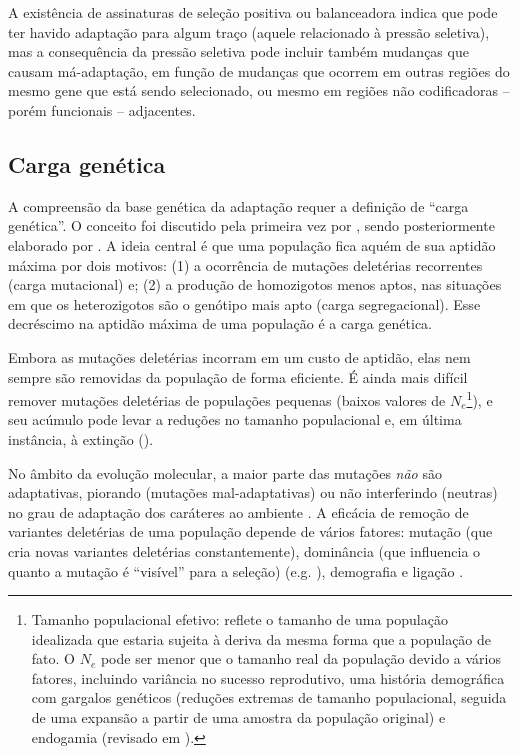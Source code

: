 \begin{refsection}
A existência de assinaturas de seleção positiva ou balanceadora indica que pode ter havido adaptação para algum traço (aquele relacionado à pressão seletiva), mas a consequência da pressão seletiva pode incluir também mudanças que causam má-adaptação, em função de mudanças que ocorrem em outras regiões do mesmo gene que está sendo selecionado, ou mesmo em regiões não codificadoras  -- porém funcionais -- adjacentes.

\subsection{Carga genética}%
%

	A compreensão da base genética da adaptação requer a definição de “carga genética”. O conceito foi discutido pela primeira vez por \textcite{Haldane1937}, sendo posteriormente elaborado por \textcite{Muller1950}. A ideia central é que uma população fica aquém de sua aptidão máxima por dois motivos: (1) a ocorrência de mutações deletérias recorrentes (carga mutacional) e; (2) a produção de homozigotos menos aptos, nas situações em que os heterozigotos são o genótipo mais apto (carga segregacional). Esse decréscimo na aptidão máxima de uma população é a carga genética.
%

Embora as mutações deletérias incorram em um custo de aptidão, elas nem sempre são removidas da população de forma eficiente. É ainda mais difícil remover mutações deletérias de populações pequenas (baixos valores de $N_{e}$\footnote{Tamanho populacional efetivo: reflete o tamanho de uma população idealizada que estaria sujeita à deriva da mesma forma que a população de fato. O $N_{e}$ pode ser menor que o tamanho real da população devido a vários fatores, incluindo variância no sucesso reprodutivo, uma história demográfica com gargalos genéticos (reduções extremas de tamanho populacional, seguida de uma expansão a partir de uma amostra da população original) e endogamia (revisado em \cite{Cutter2013}).}), e seu acúmulo pode levar a reduções no tamanho populacional e, em última instância, à extinção (\cite{Chun2011}).
%

No âmbito da evolução molecular, a maior parte das mutações \emph{não} são adaptativas, piorando (mutações mal-adaptativas) ou não interferindo (neutras) no grau de adaptação dos caráteres ao ambiente \parencite{Orr1998}. A eficácia de remoção de variantes deletérias de uma população depende de vários fatores: mutação (que cria novas variantes deletérias constantemente), dominância (que influencia o quanto a mutação é \enquote{visível} para a seleção) (e.g. \cite{Sellis2011a}), demografia e ligação \parencite{Gravel2016}.  


\end{refsection}

